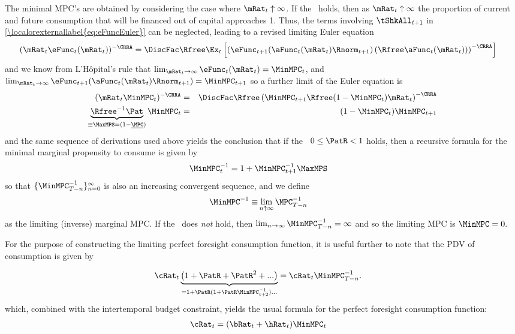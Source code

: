 \documentclass[\econtexRoot/BufferStockTheory.tex]{subfiles}
\begin{document}
The minimal MPC's are obtained by considering the case where
$\mRat_{t} \uparrow \infty$.  If the \FHWC~holds, then as
$\mRat_{t} \uparrow \infty$ the proportion of current and future
consumption that will be financed out of capital approaches 1.  Thus,
the terms involving $\tShkAll_{t+1}$ in \eqref{\localorexternallabel{eq:eFuncEuler}} can be
neglected, leading to a revised limiting Euler equation
\begin{eqnarray*}
 ({\mRat_{t}}\eFunc_{t}(\mRat_{t}))^{-\CRRA}  & = \DiscFac \Rfree \Ex_{t}\left[\left(\eFunc_{t+1}(\aFunc_{t}(\mRat_{t})\Rnorm_{t+1})\left({\Rfree \aFunc_{t}(\mRat_{t})}\right)\right)^{-\CRRA}\right]
\end{eqnarray*}
and we know from L'H\^opital's rule that $\lim_{\mRat_{t} \rightarrow \infty} \eFunc_{t}(\mRat_{t}) = \MinMPC_{t}$, and $\lim_{\mRat_{t} \rightarrow \infty} \eFunc_{t+1}(\aFunc_{t}(\mRat_{t})\Rnorm_{t+1}) = \MinMPC_{t+1}$ so a further limit of the Euler equation is\hypertarget{MPCnvrs}{}
\begin{eqnarray*}
  (\mRat_{t}\MinMPC_{t})^{-\CRRA}  & = & \DiscFac \Rfree \left(\MinMPC_{t+1} \Rfree (1-\MinMPC_{t})\mRat_{t}\right)^{-\CRRA}
\\ \underbrace{{\Rfree}^{-1}{\Pat}}_{\equiv \MaxMPS = (1-\ushort{\MPC})} \MinMPC_{t}  & = & (1-\MinMPC_{t}) \MinMPC_{t+1}
\end{eqnarray*}
and the same sequence of derivations used above yields the conclusion
that if the \RIC~$0 \leq \PatR < 1$ holds, then a recursive formula for the
minimal marginal propensity to consume is given by
\begin{align}
 \MinMPC_{t}^{-1}  & = 1+\MinMPC_{t+1}^{-1}\MaxMPS  \label{eq:MinMPCInvApndx}
\end{align}
so that $\{\MinMPC_{T-n}^{-1}\}_{n=0}^{\infty}$ is also an increasing
convergent sequence, and we define
\begin{align}
\MinMPC^{-1} \equiv &\lim_{n \uparrow \infty} \MPC_{T-n}^{-1}  
\end{align}
as the limiting (inverse) marginal MPC.  If the \RIC~does \textit{not} hold, then $\lim_{n \rightarrow \infty} \MinMPC_{T-n}^{-1} = \infty$
and so the limiting MPC is $\MinMPC = 0.$

For the purpose of constructing the limiting perfect foresight consumption function, it is useful further to note that
the PDV of consumption is given by\hypertarget{MPCnvrsIsCPDV}{}

\begin{eqnarray*}
  \cRat_{t}\underbrace{\left(1 + \PatR + \PatR^{2} + ... \right)}_{=1+\PatR(1+\PatR\MinMPC_{t+2}^{-1})...}   & = \cRat_{t}\MinMPC_{T-n}^{-1}.
\end{eqnarray*}
which, combined with the intertemporal budget constraint, yields the usual formula for the perfect foresight consumption function:
\begin{align}
  \cRat_{t} & = (\bRat_{t}+\hRat_{t})\MinMPC_{t}
\end{align}
\end{document}

